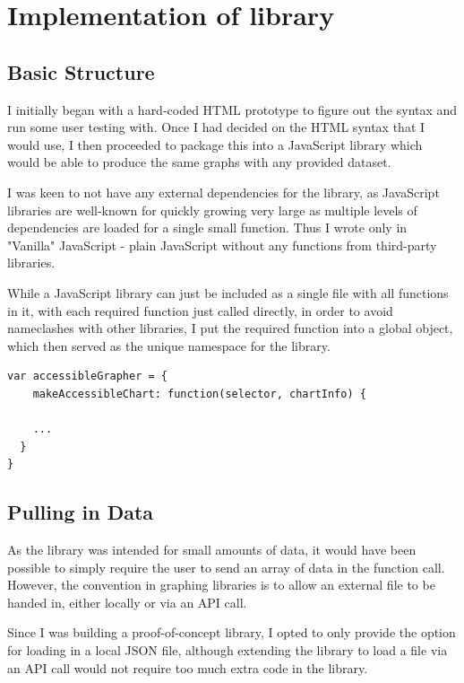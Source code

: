 \documentclass[ %
                    author={Aleena Baig},
                supervisor={Dr Simon Lock},
                    degree={BSc},
                     title={On Making Web Accessible Graphs},
                  subtitle={},
                      year={2019} ]{dissertation}
\begin{document}
\section{Implementation of library}

\subsection{Basic Structure}

I initially began with a hard-coded HTML prototype to figure out the syntax and run some user testing with. Once I had decided on the HTML syntax that I would use, I then proceeded to package this into a JavaScript library which would be able to produce the same graphs with any provided dataset.

I was keen to not have any external dependencies for the library, as JavaScript libraries are well-known for quickly growing very large as multiple levels of dependencies are loaded for a single small function. Thus I wrote only in "Vanilla" JavaScript - plain JavaScript without any functions from third-party libraries.

While a JavaScript library can just be included as a single file with all functions in it, with each required function just called directly, in order to avoid nameclashes with other libraries, I put the required function into a global object, which then served as the unique namespace for the library.
\newline
\begin{lstlisting}
var accessibleGrapher = {
    makeAccessibleChart: function(selector, chartInfo) {

    ...
  }
}
\end{lstlisting}

\subsection{Pulling in Data}

As the library was intended for small amounts of data, it would have been possible to simply require the user to send an array of data in the function call. However, the convention in graphing libraries is to allow an external file to be handed in, either locally or via an API call.

Since I was building a proof-of-concept library, I opted to only provide the option for loading in a local JSON file, although extending the library to load a file via an API call would not require too much extra code in the library.
\end{document}

